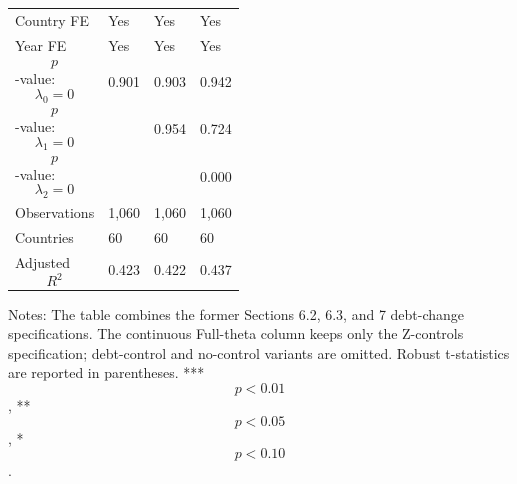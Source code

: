 \begin{table}[H]
\begin{threeparttable}
\begin{tabularx}{\textwidth}{lYYY}
Country FE & Yes & Yes & Yes \\
Year FE & Yes & Yes & Yes \\
$$p$$-value: $$\lambda_0=0$$ & 0.901 & 0.903 & 0.942 \\
$$p$$-value: $$\lambda_1=0$$ &  & 0.954 & 0.724 \\
$$p$$-value: $$\lambda_2=0$$ &  &  & 0.000 \\
Observations & 1,060 & 1,060 & 1,060 \\
Countries & 60 & 60 & 60 \\
Adjusted $$R^2$$ & 0.423 & 0.422 & 0.437 \\
\bottomrule
\end{tabularx}
\begin{tablenotes}[flushleft]\footnotesize
\item Notes: The table combines the former Sections 6.2, 6.3, and 7 debt-change specifications. The continuous Full-theta column keeps only the Z-controls specification; debt-control and no-control variants are omitted. Robust t-statistics are reported in parentheses. *** $$p<0.01$$, ** $$p<0.05$$, * $$p<0.10$$.
\end{tablenotes}
\end{threeparttable}
\end{table}
